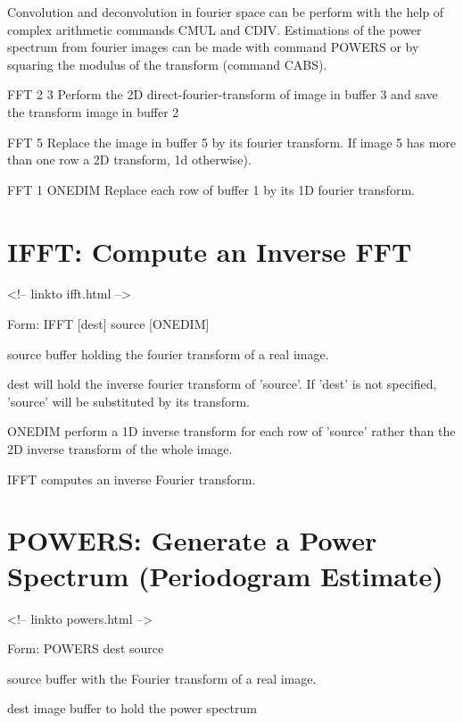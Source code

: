 Convolution and deconvolution in fourier space can be perform with the help
of complex arithmetic commands CMUL and CDIV. Estimations of the power
spectrum from fourier images can be made with command POWERS or by
squaring the modulus of the transform (command CABS).

\begin{example}
  \item[FFT 2 3\hfill]{Perform the 2D direct-fourier-transform of 
       image in buffer 3 and save the transform image in buffer 2}
  \item[FFT 5\hfill]{Replace the image in buffer 5 by its fourier transform. 
       If image 5 has more than one row a 2D transform, 1d otherwise).}
  \item[FFT 1 ONEDIM\hfill]{Replace each row of buffer 1 by its 1D fourier 
       transform.}
\end{example}

\section{IFFT: Compute an Inverse FFT}
\begin{rawhtml}
<!-- linkto ifft.html -->
\end{rawhtml}
\begin{command}
  \item[Form: IFFT  {[dest]} source {[ONEDIM]}\hfill]{}
  \item[source]{buffer holding the fourier transform of a real image.}
  \item[dest]{will hold the inverse fourier transform of 'source'. If
       'dest' is not specified, 'source' will be substituted by its
       transform.}
  \item[ONEDIM]{perform a 1D inverse transform for each row of 'source'
       rather than the 2D inverse transform of the whole image.}
\end{command}

IFFT computes an inverse Fourier transform.

\section{POWERS: Generate a Power Spectrum (Periodogram Estimate)}
\begin{rawhtml}
<!-- linkto powers.html -->
\end{rawhtml}
\begin{command}
  \item[Form: POWERS dest source\hfill]{}
  \item[source]{buffer with the Fourier transform of a real image.}
  \item[dest]{image buffer to hold the power spectrum}
\end{command}

